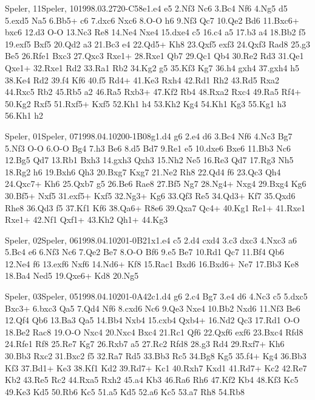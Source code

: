 \documentclass[twocolumn,a4paper,10pt]{report}
\begin{document}
\begin{chessgame}{Speler, 11}{Speler, 10}{1998.03.27}{20}{\textonehalf-\textonehalf}{C58e}{1.e4 e5 2.Nf3 Nc6 3.Bc4 Nf6 4.Ng5 d5 5.exd5 Na5 6.Bb5+ c6 7.dxc6 Nxc6 8.O-O h6 9.Nf3 Qc7 10.Qe2 Bd6 11.Bxc6+ bxc6 12.d3 O-O 13.Nc3 Re8 14.Ne4 Nxe4 15.dxe4 c5 16.c4 a5 17.b3 a4 18.Bb2 f5 19.exf5 Bxf5 20.Qd2 a3 21.Bc3 e4 22.Qd5+ Kh8 23.Qxf5 exf3 24.Qxf3 Rad8 25.g3 Be5 26.Rfe1 Bxc3 27.Qxc3 Rxe1+ 28.Rxe1 Qb7 29.Qc1 Qb4 30.Re2 Rd3 31.Qe1 Qxe1+ 32.Rxe1 Rd2 33.Ra1 Rb2 34.Kg2 g5 35.Kf3 Kg7 36.h4 gxh4 37.gxh4 h5 38.Ke4 Rd2 39.f4 Kf6 40.f5 Rd4+ 41.Ke3 Rxh4 42.Rd1 Rh2 43.Rd5 Rxa2 44.Rxc5 Rb2 45.Rb5 a2 46.Ra5 Rxb3+ 47.Kf2 Rb4 48.Rxa2 Rxc4 49.Ra5 Rf4+ 50.Kg2 Rxf5 51.Rxf5+ Kxf5 52.Kh1 h4 53.Kh2 Kg4 54.Kh1 Kg3 55.Kg1 h3 56.Kh1 h2}\end{chessgame}
\begin{chessgame}{Speler, 01}{Speler, 07}{1998.04.10}{20}{0-1}{B08g}{1.d4 g6 2.e4 d6 3.Bc4 Nf6 4.Nc3 Bg7 5.Nf3 O-O 6.O-O Bg4 7.h3 Be6 8.d5 Bd7 9.Re1 e5 10.dxe6 Bxe6 11.Bb3 Nc6 12.Bg5 Qd7 13.Rb1 Bxh3 14.gxh3 Qxh3 15.Nh2 Ne5 16.Re3 Qd7 17.Rg3 Nh5 18.Rg2 h6 19.Bxh6 Qh3 20.Bxg7 Kxg7 21.Ne2 Rh8 22.Qd4 f6 23.Qc3 Qh4 24.Qxc7+ Kh6 25.Qxb7 g5 26.Be6 Rae8 27.Bf5 Ng7 28.Ng4+ Nxg4 29.Bxg4 Kg6 30.Bf5+ Nxf5 31.exf5+ Kxf5 32.Ng3+ Kg6 33.Qf3 Re5 34.Qd3+ Kf7 35.Qxd6 Rhe8 36.Qd3 f5 37.Kf1 Kf6 38.Qa6+ R8e6 39.Qxa7 Qc4+ 40.Kg1 Re1+ 41.Rxe1 Rxe1+ 42.Nf1 Qxf1+ 43.Kh2 Qh1+ 44.Kg3}\end{chessgame}
\begin{chessgame}{Speler, 02}{Speler, 06}{1998.04.10}{20}{1-0}{B21x}{1.e4 c5 2.d4 cxd4 3.c3 dxc3 4.Nxc3 a6 5.Bc4 e6 6.Nf3 Nc6 7.Qe2 Be7 8.O-O Bf6 9.e5 Be7 10.Rd1 Qc7 11.Bf4 Qb6 12.Ne4 f6 13.exf6 Nxf6 14.Nd6+ Kf8 15.Rac1 Bxd6 16.Bxd6+ Ne7 17.Bb3 Ke8 18.Ba4 Ned5 19.Qxe6+ Kd8 20.Ng5}\end{chessgame}
\begin{chessgame}{Speler, 03}{Speler, 05}{1998.04.10}{20}{1-0}{A42c}{1.d4 g6 2.c4 Bg7 3.e4 d6 4.Nc3 c5 5.dxc5 Bxc3+ 6.bxc3 Qa5 7.Qd4 Nf6 8.cxd6 Nc6 9.Qe3 Nxe4 10.Bb2 Nxd6 11.Nf3 Be6 12.Qf4 Qb6 13.Ba3 Qa5 14.Bb4 Nxb4 15.cxb4 Qxb4+ 16.Nd2 Qc3 17.Rd1 O-O 18.Be2 Rac8 19.O-O Nxc4 20.Nxc4 Bxc4 21.Rc1 Qf6 22.Qxf6 exf6 23.Bxc4 Rfd8 24.Rfe1 Rf8 25.Re7 Kg7 26.Rxb7 a5 27.Rc2 Rfd8 28.g3 Rd4 29.Rxf7+ Kh6 30.Bb3 Rxc2 31.Bxc2 f5 32.Ra7 Rd5 33.Bb3 Rc5 34.Bg8 Kg5 35.f4+ Kg4 36.Bb3 Kf3 37.Bd1+ Ke3 38.Kf1 Kd2 39.Rd7+ Kc1 40.Rxh7 Kxd1 41.Rd7+ Kc2 42.Re7 Kb2 43.Re5 Rc2 44.Rxa5 Rxh2 45.a4 Kb3 46.Ra6 Rh6 47.Kf2 Kb4 48.Kf3 Kc5 49.Ke3 Kd5 50.Rb6 Kc5 51.a5 Kd5 52.a6 Kc5 53.a7 Rh8 54.Rb8}\end{chessgame}
\end{document}
